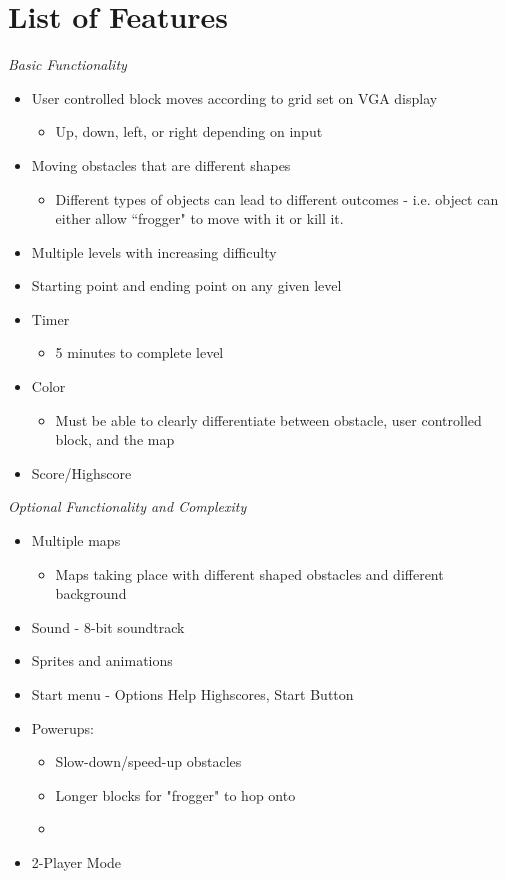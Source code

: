 \documentclass[journal, twocolumn, final,11pt,letterpaper]{IEEEtran}
\begin{document}
\section{List of Features}
\textit{Basic Functionality}
\begin{itemize}
	\item User controlled block moves according to grid set on VGA display
	\begin{itemize}
		\item Up, down, left, or right depending on input
	\end{itemize}
	\item Moving obstacles that are different shapes
	\begin{itemize}
		\item Different types of objects can lead to different outcomes - i.e. object can either allow ``frogger" to move with it or kill it.
	\end{itemize}
	\item Multiple levels with increasing difficulty
	\item Starting point and ending point on any given level
	\item Timer
		\begin{itemize}
			\item 5 minutes to complete level
		\end{itemize} 
	\item Color 
	\begin{itemize}
		\item Must be able to clearly differentiate between obstacle, user controlled block, and the map
	\end{itemize}
	\item Score/Highscore
\end{itemize}

\vspace{5mm}

\textit{Optional Functionality and Complexity}
\begin{itemize}
	\item Multiple maps
	\begin{itemize}
		\item Maps taking place with different shaped obstacles and different background
	\end{itemize}
	\item Sound - 8-bit soundtrack
	\item Sprites and animations
	\item Start menu - Options Help Highscores, Start Button
	\item Powerups:
		\begin{itemize}
			\item Slow-down/speed-up obstacles
			\item Longer blocks for "frogger" to hop onto
			\item 
		\end{itemize}
	\item 2-Player Mode
\end{itemize}
\end{document}
